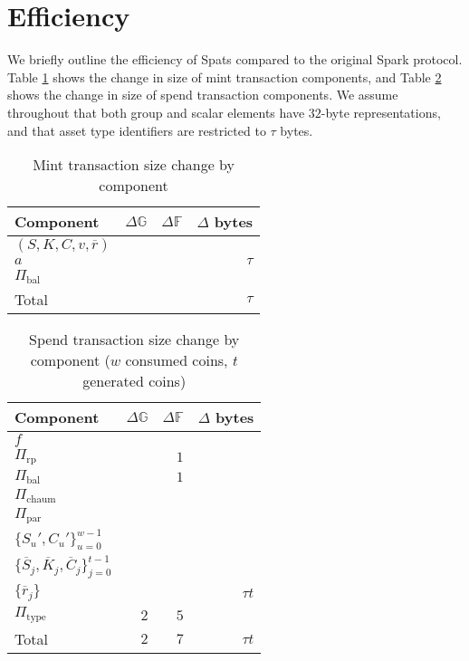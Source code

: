 \documentclass{article}
\newcommand{\G}{\mathbb{G}}
\newcommand{\F}{\mathbb{F}}
\begin{document}
\section{Efficiency}

We briefly outline the efficiency of Spats compared to the original Spark protocol.
Table \ref{table:size_mint} shows the change in size of mint transaction components, and Table \ref{table:size_spend} shows the change in size of spend transaction components.
We assume throughout that both group and scalar elements have $32$-byte representations, and that asset type identifiers are restricted to $\tau$ bytes.

\begin{table}[ht]
    \centering
    \begin{tabular}{|l|r|r|r|}
    \hline
    \textbf{Component} & \textbf{$\Delta\G$} & \textbf{$\Delta\F$} & \textbf{$\Delta$ bytes} \\
    \hline
    $(S,K,C,v,\overline{r})$ & & & \\
    $a$ & &  & $\tau$ \\
    $\Pi_{\text{bal}}$ & & & \\
    \hline
    Total & & & $\tau$ \\
    \hline
    \end{tabular}
    \caption{Mint transaction size change by component}
    \label{table:size_mint}
\end{table}

\begin{table}[ht]
    \centering
    \begin{tabular}{|l|r|r|r|}
    \hline
    \textbf{Component} & \textbf{$\Delta\G$} & \textbf{$\Delta\F$} & \textbf{$\Delta$ bytes} \\
    \hline
    $f$ & & & \\
    $\Pi_{\text{rp}}$ & & $1$ & \\
    $\Pi_{\text{bal}}$ & & $1$ & \\
    $\Pi_{\text{chaum}}$ & & & \\
    $\Pi_{\text{par}}$ & & & \\
    $\{S_u',C_u'\}_{u=0}^{w-1}$ & & & \\
    $\{\overline{S}_j,\overline{K}_j,\overline{C}_j\}_{j=0}^{t-1}$ & & & \\
    $\{\overline{r}_j\}$ & & & $\tau t$ \\
    $\Pi_{\text{type}}$ & $2$ & $5$ & \\
    \hline
    Total & $2$ & $7$ & $\tau t$ \\
    \hline
    \end{tabular}
    \caption{Spend transaction size change by component ($w$ consumed coins, $t$ generated coins)}
    \label{table:size_spend}
\end{table}
\end{document}
